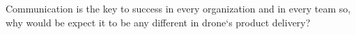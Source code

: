 \documentclass[conference]{IEEEtran}
\begin{document}
Communication is the key to success in every organization and in every team so, why would be expect it to be any different in drone`s product delivery?\\




%




\nocite{*}



%
%
%

\end{document}
